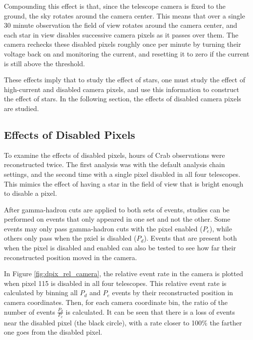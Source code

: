     Compounding this effect is that, since the telescope camera is fixed to the ground, the sky rotates around the camera center.
    This means that over a single 30 minute observation the field of view rotates around the camera center, and each star in view disables successive camera pixels as it passes over them.
    The camera rechecks these disabled pixels roughly once per minute by turning their voltage back on and monitoring the current, and resetting it to zero if the current is still above the threshold.

    These effects imply that to study the effect of stars, one must study the effect of high-current and disabled camera pixels, and use this information to construct the effect of stars.
    In the following section, the effects of disabled camera pixels are studied.
    
  \subsection{Effects of Disabled Pixels}

    To examine the effects of disabled pixels,  hours of Crab observations were reconstructed twice.
    The first analysis was with the default analysis chain settings, and the second time with a single pixel disabled in all four telescopes.
    This mimics the effect of having a star in the field of view that is bright enough to disable a pixel.

    After gamma-hadron cuts are applied to both sets of events, studies can be performed on events that only appeared in one set and not the other.
    Some events may only pass gamma-hadron cuts with the pixel enabled ($P_e$), while others only pass when the pxiel is disabled ($P_d$).
    Events that are present both when the pixel is disabled and enabled can also be tested to see how far their reconstructed position moved in the camera.

    In Figure \ref{fig:dpix_rel_camera}, the relative event rate in the camera is plotted when pixel 115 is disabled in all four telescopes.
    This relative event rate is calculated by binning all $P_d$ and $P_e$ events by their reconstructed position in camera coordinates.
    Then, for each camera coordinate bin, the ratio of the number of events $\frac{P_d}{P_e}$ is calculated.
    It can be seen that there is a loss of events near the disabled pixel (the black circle), with a rate closer to 100\% the farther one goes from the disabled pixel.

